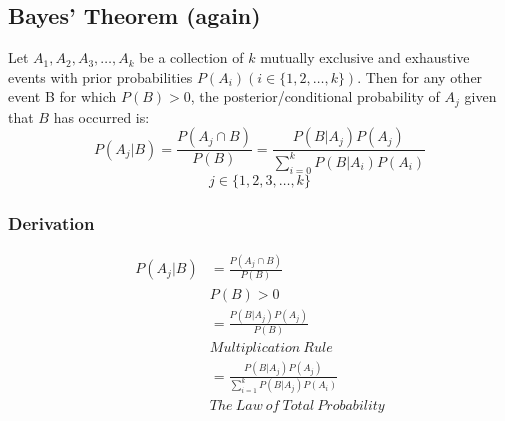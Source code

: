 \documentclass{math}
\begin{document}
\subsection*{Bayes' Theorem (again)}
Let \( A_{1}, A_{2}, A_{3}, \dots, A_{k} \) be a collection of \( k \)
mutually exclusive and exhaustive events with prior probabilities
\( P(A_{i})(i \in \{1, 2, \dots, k\}) \). Then for any other event B for which
\( P(B) > 0 \), the posterior/conditional probability of \( A_{j} \) given
that \( B \) has occurred is:
\[ P(A_{j}|B) = \frac{P(A_{j} \cap B)}{P(B)} =
   \frac{P(B|A_{j})P(A_{j})}{\sum_{i=0}^{k}P(B|A_{i})P(A_{i})} \]
\[ j \in \{1, 2, 3, \dots, k \} \]

\subsubsection*{Derivation}
\begin{align*}
  P(A_{j}|B) &= \frac{P(A_{j} \cap B)}{P(B)} \\
  & P(B) > 0 \\
  &= \frac{P(B|A_{j})P(A_{j})}{P(B)} \\
  & Multiplication\ Rule \\
  &= \frac{P(B|A_{j})P(A_{j})}{\sum_{i=1}^{k}P(B|A_{j})P(A_{i})} \\
  & The\ Law\ of\ Total\ Probability
\end{align*}
\end{document}
